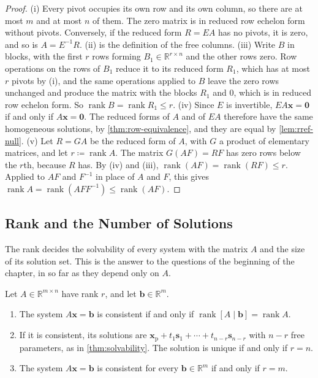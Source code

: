 \begin{proof}
(i) Every pivot occupies its own row and its own column, so there are at most $m$ and at most $n$ of them. The zero matrix is in reduced row echelon form without pivots. Conversely, if the reduced form $R=EA$ has no pivots, it is zero, and so is $A=E^{-1}R$. (ii) is the definition of the free columns. (iii) Write $B$ in blocks, with the first $r$ rows forming $B_1\in\mathbb R^{r\times n}$ and the other rows zero. Row operations on the rows of $B_1$ reduce it to its reduced form $R_1$, which has at most $r$ pivots by (i), and the same operations applied to $B$ leave the zero rows unchanged and produce the matrix with the blocks $R_1$ and $0$, which is in reduced row echelon form. So $\operatorname{rank}B=\operatorname{rank}R_1\le r$. (iv) Since $E$ is invertible, $EA\mathbf x=\mathbf 0$ if and only if $A\mathbf x=\mathbf 0$. The reduced forms of $A$ and of $EA$ therefore have the same homogeneous solutions, by \cref{thm:row-equivalence}, and they are equal by \cref{lem:rref-null}. (v) Let $R=GA$ be the reduced form of $A$, with $G$ a product of elementary matrices, and let $r\coloneqq\operatorname{rank}A$. The matrix $G(AF)=RF$ has zero rows below the $r$th, because $R$ has. By (iv) and (iii), $\operatorname{rank}(AF)=\operatorname{rank}(RF)\le r$. Applied to $AF$ and $F^{-1}$ in place of $A$ and $F$, this gives $\operatorname{rank}A=\operatorname{rank}(AFF^{-1})\le\operatorname{rank}(AF)$.
\end{proof}

\subsection{Rank and the Number of Solutions}

The rank decides the solvability of every system with the matrix $A$ and the size of its solution set. This is the answer to the questions of the beginning of the chapter, in so far as they depend only on $A$.

\begin{theorem}
\label{thm:rank-solutions}
Let $A\in\mathbb R^{m\times n}$ have rank $r$, and let $\mathbf b\in\mathbb R^m$.
\begin{enumerate}
\item The system $A\mathbf x=\mathbf b$ is consistent if and only if $\operatorname{rank}[A\mid\mathbf b]=\operatorname{rank}A$.
\item If it is consistent, its solutions are $\mathbf x_{\mathrm p}+t_1\mathbf s_1+\cdots+t_{n-r}\mathbf s_{n-r}$ with $n-r$ free parameters, as in \cref{thm:solvability}. The solution is unique if and only if $r=n$.
\item The system $A\mathbf x=\mathbf b$ is consistent for every $\mathbf b\in\mathbb R^m$ if and only if $r=m$.
\end{enumerate}
\end{theorem}

